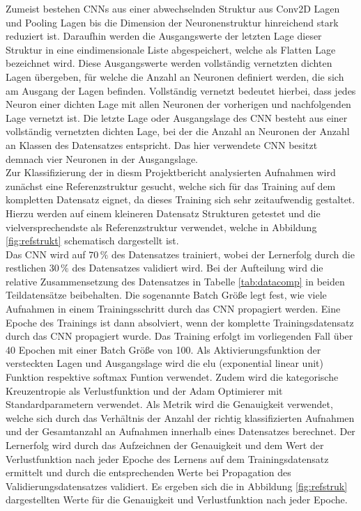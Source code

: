 Zumeist bestehen CNNs aus einer abwechselnden Struktur aus Conv2D Lagen und Pooling Lagen bis die Dimension der Neuronenstruktur hinreichend stark reduziert ist. Daraufhin werden die Ausgangswerte der letzten Lage dieser Struktur in eine eindimensionale Liste abgespeichert, welche als Flatten Lage bezeichnet wird. Diese Ausgangswerte werden vollständig vernetzten dichten Lagen übergeben, für welche die Anzahl an Neuronen definiert werden, die sich am Ausgang der Lagen befinden. Vollständig vernetzt bedeutet hierbei, dass jedes Neuron einer dichten Lage mit allen Neuronen der vorherigen und nachfolgenden Lage vernetzt ist. Die letzte Lage oder Ausgangslage des CNN besteht aus einer vollständig vernetzten dichten Lage, bei der die Anzahl an Neuronen der Anzahl an Klassen des Datensatzes entspricht. Das hier verwendete CNN besitzt demnach vier Neuronen in der Ausgangslage. \\ 
Zur Klassifizierung der in diesm Projektbericht analysierten Aufnahmen wird zunächst eine Referenzstruktur gesucht, welche sich für das Training auf dem kompletten Datensatz eignet, da dieses Training sich sehr zeitaufwendig gestaltet. Hierzu werden auf einem kleineren Datensatz Strukturen getestet und die vielversprechendste als Referenzstruktur verwendet, welche in Abbildung \ref{fig:refstrukt} schematisch dargestellt ist. \\
Das CNN wird auf $70\,\%$ des Datensatzes trainiert, wobei der Lernerfolg durch die restlichen $30\,\%$ des Datensatzes validiert wird. Bei der Aufteilung wird die relative Zusammensetzung des Datensatzes  in Tabelle \ref{tab:datacomp} in beiden Teildatensätze beibehalten. Die sogenannte Batch Größe legt fest, wie viele Aufnahmen in einem Trainingsschritt durch das CNN propagiert werden. Eine Epoche des Trainings ist dann absolviert, wenn der komplette Trainingsdatensatz durch das CNN propagiert wurde. Das Training erfolgt im vorliegenden Fall über 40 Epochen mit einer Batch Größe von 100. Als Aktivierungsfunktion der versteckten Lagen und Ausgangslage wird die elu (exponential linear unit) Funktion respektive softmax Funtion verwendet. Zudem wird die kategorische Kreuzentropie als Verlustfunktion und der Adam Optimierer \cite{Adam} mit Standardparametern verwendet. Als Metrik wird die Genauigkeit verwendet, welche sich durch das Verhältnis der Anzahl der richtig klassifizierten Aufnahmen und der Gesamtanzahl an Aufnahmen innerhalb eines Datensatzes berechnet. Der Lernerfolg wird durch das Aufzeichnen der Genauigkeit und dem Wert der Verlustfunktion nach jeder Epoche des Lernens auf dem Trainingsdatensatz ermittelt und durch die entsprechenden Werte bei Propagation des Validierungsdatensatzes validiert. Es ergeben sich die in Abbildung \ref{fig:refstruk} dargestellten Werte für die Genauigkeit und Verlustfunktion nach jeder Epoche.\\
